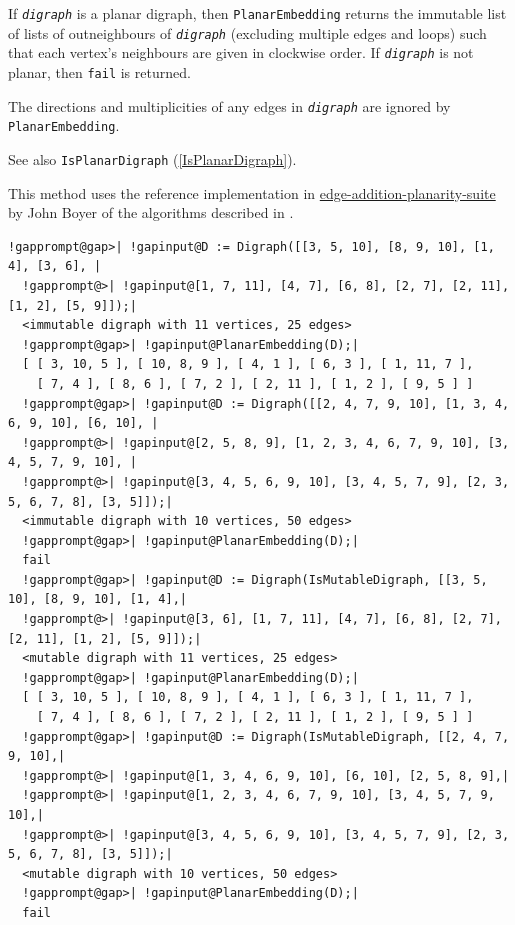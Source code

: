 \documentclass[a4paper,11pt]{report}
\begin{document}
{{{ If \mbox{\texttt{\mdseries\slshape digraph}} is a planar digraph, then \texttt{PlanarEmbedding} returns the immutable list of lists of out\texttt{}neighbours of \mbox{\texttt{\mdseries\slshape digraph}} (excluding multiple edges and loops) such that each vertex's neighbours are
given in clockwise order. If \mbox{\texttt{\mdseries\slshape digraph}} is not planar, then \texttt{fail} is returned. 

 The directions and multiplicities of any edges in \mbox{\texttt{\mdseries\slshape digraph}} are ignored by \texttt{PlanarEmbedding}. 

 See also \texttt{IsPlanarDigraph} (\ref{IsPlanarDigraph}). 

 This method uses the reference implementation in \href{https://github.com/graph-algorithms/edge-addition-planarity-suite} {edge-addition-planarity-suite}  by John Boyer of the algorithms described in \cite{BM06}. 
\begin{Verbatim}[commandchars=!@|,fontsize=\small,frame=single,label=Example]
  !gapprompt@gap>| !gapinput@D := Digraph([[3, 5, 10], [8, 9, 10], [1, 4], [3, 6], |
  !gapprompt@>| !gapinput@[1, 7, 11], [4, 7], [6, 8], [2, 7], [2, 11], [1, 2], [5, 9]]);|
  <immutable digraph with 11 vertices, 25 edges>
  !gapprompt@gap>| !gapinput@PlanarEmbedding(D);|
  [ [ 3, 10, 5 ], [ 10, 8, 9 ], [ 4, 1 ], [ 6, 3 ], [ 1, 11, 7 ], 
    [ 7, 4 ], [ 8, 6 ], [ 7, 2 ], [ 2, 11 ], [ 1, 2 ], [ 9, 5 ] ]
  !gapprompt@gap>| !gapinput@D := Digraph([[2, 4, 7, 9, 10], [1, 3, 4, 6, 9, 10], [6, 10], |
  !gapprompt@>| !gapinput@[2, 5, 8, 9], [1, 2, 3, 4, 6, 7, 9, 10], [3, 4, 5, 7, 9, 10], |
  !gapprompt@>| !gapinput@[3, 4, 5, 6, 9, 10], [3, 4, 5, 7, 9], [2, 3, 5, 6, 7, 8], [3, 5]]);|
  <immutable digraph with 10 vertices, 50 edges>
  !gapprompt@gap>| !gapinput@PlanarEmbedding(D);|
  fail
  !gapprompt@gap>| !gapinput@D := Digraph(IsMutableDigraph, [[3, 5, 10], [8, 9, 10], [1, 4],|
  !gapprompt@>| !gapinput@[3, 6], [1, 7, 11], [4, 7], [6, 8], [2, 7], [2, 11], [1, 2], [5, 9]]);|
  <mutable digraph with 11 vertices, 25 edges>
  !gapprompt@gap>| !gapinput@PlanarEmbedding(D);|
  [ [ 3, 10, 5 ], [ 10, 8, 9 ], [ 4, 1 ], [ 6, 3 ], [ 1, 11, 7 ], 
    [ 7, 4 ], [ 8, 6 ], [ 7, 2 ], [ 2, 11 ], [ 1, 2 ], [ 9, 5 ] ]
  !gapprompt@gap>| !gapinput@D := Digraph(IsMutableDigraph, [[2, 4, 7, 9, 10],|
  !gapprompt@>| !gapinput@[1, 3, 4, 6, 9, 10], [6, 10], [2, 5, 8, 9],|
  !gapprompt@>| !gapinput@[1, 2, 3, 4, 6, 7, 9, 10], [3, 4, 5, 7, 9, 10],|
  !gapprompt@>| !gapinput@[3, 4, 5, 6, 9, 10], [3, 4, 5, 7, 9], [2, 3, 5, 6, 7, 8], [3, 5]]);|
  <mutable digraph with 10 vertices, 50 edges>
  !gapprompt@gap>| !gapinput@PlanarEmbedding(D);|
  fail
\end{Verbatim}
 }

}}
\end{document}
